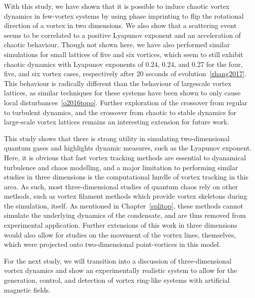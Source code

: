 With this study, we have shown that it is possible to induce chaotic vortex dynamics in few-vortex systems by using phase imprinting to flip the rotational direction of a vortex in two dimensions.
We also show that a scattering event seems to be correlated to a positive Lyapunov exponent and an acceleration of chaotic behaviour.
Though not shown here, we have also performed similar simulations for small lattices of five and six vortices, which seem to still exhibit chaotic dynamics with Lyapunov exponents of 0.24, 0.24, and 0.27 for the four, five, and six vortex cases, respectively after 20 seconds of evolution~\ref{zhang2017}.
This behaviour is radically different than the behaviour of largescale vortex lattices, as similar techniques for these systems have been shown to only cause local disturbances~\ref{o2016topo}.
Further exploration of the crossover from regular to turbulent dynamics, and the crossover from chaotic to stable dynamics for large-scale vortex lattices remains an interesting extension for future work.

This study shows that there is strong utility in simulating two-dimensional quantum gases and highlights dynamic measures, such as the Lyapunov exponent.
Here, it is obvious that fast vortex tracking methods are essential to dyanamical turbulence and chaos modelling, and a major limitation to performing similar studies in three dimensions is the computational hurdle of vortex tracking in this area.
As such, most three-dimensional studies of quantum chaos rely on other methods, such as vortex filament methods which provide vortex skeletons during the simulation, itself.
As mentioned in Chapter~\ref{splitop}, these methods cannot simulate the underlying dynamics of the condensate, and are thus removed from experimental application.
Further extensions of this work in three dimensions would also allow for studies on the movement of the vortex lines, themselves, which were projected onto two-dimensional point-vortices in this model.

For the next study, we will transition into a discussion of three-dimensional vortex dynamics and show an experimentally realistic system to allow for the generation, control, and detection of vortex ring-like systems with artificial magnetic fields.


